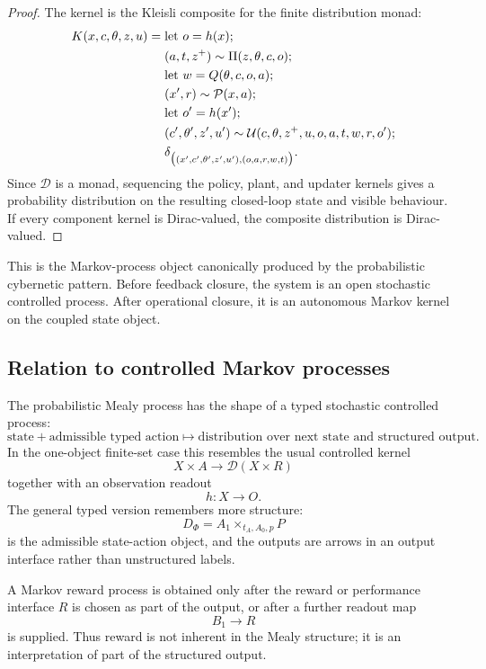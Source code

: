 \begin{proof}
The kernel is the Kleisli composite for the finite distribution monad:
\[
\begin{aligned}
K(x,c,\theta,z,u)
=
{}&
\text{\rm let } o=h(x) \text{\rm ;}\\
&
(a,t,z^+)\sim \Pi(z,\theta,c,o);\\
&
\text{\rm let } w=Q(\theta,c,o,a) \text{\rm ;}\\
&
(x',r)\sim \mathcal P(x,a);\\
&
\text{\rm let } o'=h(x') \text{\rm ;}\\
&
(c',\theta',z',u')
\sim
\mathcal U(c,\theta,z^+,u,o,a,t,w,r,o');\\
&
\delta_{\bigl((x',c',\theta',z',u'),(o,a,r,w,t)\bigr)} .
\end{aligned}
\]
Since \(\mathcal D\) is a monad, sequencing the policy, plant, and updater kernels gives a
probability distribution on the resulting closed-loop state and visible behaviour.  If every
component kernel is Dirac-valued, the composite distribution is Dirac-valued.
\end{proof}

This is the Markov-process object canonically produced by the probabilistic cybernetic pattern.
Before feedback closure, the system is an open stochastic controlled process.  After operational
closure, it is an autonomous Markov kernel on the coupled state object.

\subsection{Relation to controlled Markov processes}
\label{subsec:relation-to-mdps}

The probabilistic Mealy process has the shape of a typed stochastic controlled process:
\[
\text{state}+\text{admissible typed action}
\longmapsto
\text{distribution over next state and structured output}.
\]
In the one-object finite-set case this resembles the usual controlled kernel
\[
X\times A\to \mathcal D(X\times R)
\]
together with an observation readout
\[
h:X\to O.
\]
The general typed version remembers more structure:
\[
D_\Phi=A_1\times_{t_A,A_0,p}P
\]
is the admissible state-action object, and the outputs are arrows in an output interface rather
than unstructured labels.

A Markov reward process is obtained only after the reward or performance interface \(R\) is chosen
as part of the output, or after a further readout map
\[
B_1\to R
\]
is supplied.  Thus reward is not inherent in the Mealy structure; it is an interpretation of part
of the structured output.

